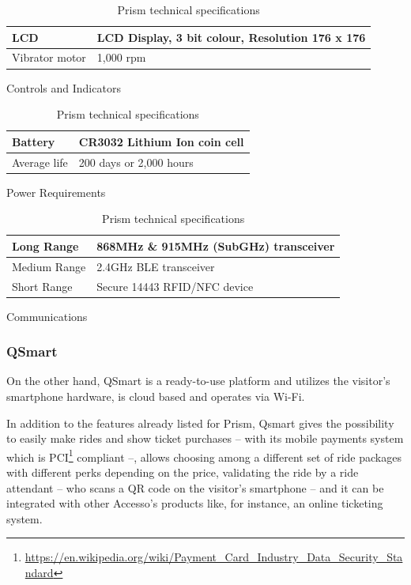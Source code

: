 \begin{table}[H]
    \centering
\begin{subtable}[t]{0.85\textwidth}
    \centering
    \begin{tabular}{|l|l|}
        \hline
        LCD & LCD Display, 3 bit colour, Resolution 176 x 176 \\ \hline
        Vibrator motor & 1,000 rpm \\
        \hline
    \end{tabular}
    \caption{Controls and Indicators}
    \label{tab:ci-tec-spec}
\end{subtable}
\begin{subtable}[t]{0.85\textwidth}
    \centering
    \begin{tabular}{|l|l|}
        \hline
        Battery & CR3032 Lithium Ion coin cell \\ \hline
        Average life & 200 days or 2,000 hours \\
        \hline
    \end{tabular}
    \caption{Power Requirements}
    \label{tab:pr-tec-spec}
\end{subtable}
\begin{subtable}[t]{0.85\textwidth}
    \centering
    \begin{tabular}{|l|l|}
        \hline
        Long Range & 868MHz \& 915MHz (SubGHz) transceiver \\ \hline
        Medium Range & 2.4GHz BLE transceiver \\ \hline
        Short Range & Secure 14443 RFID/NFC device \\
        \hline
    \end{tabular}
    \caption{Communications}
    \label{tab:c-tec-spec}
\end{subtable}
    \caption{Prism technical specifications}
    \label{tab:prism-tech-spec}
\end{table}

\subsubsection*{QSmart}
On the other hand, QSmart is a ready-to-use platform and utilizes the visitor's smartphone hardware, is cloud based
and operates via Wi-Fi.

In addition to the features already listed for Prism, Qsmart gives the possibility to easily make rides and
show ticket purchases -- with its mobile payments system which is
PCI\footnote{\url{https://en.wikipedia.org/wiki/Payment_Card_Industry_Data_Security_Standard}} compliant --,
allows choosing among a different set of ride packages with different perks depending on the price, validating the
ride by a ride attendant -- who scans a QR code on the visitor's smartphone -- and it can be integrated with other Accesso's products like, for instance, an online ticketing system.


